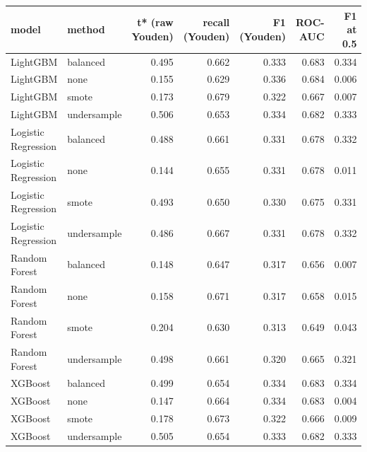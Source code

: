 \begin{tabular}{llrrrrr}
\toprule
model & method & t* (raw Youden) & recall (Youden) & F1 (Youden) & ROC-AUC & F1 at 0.5 \\
\midrule
LightGBM & balanced & 0.495 & 0.662 & 0.333 & 0.683 & 0.334 \\
LightGBM & none & 0.155 & 0.629 & 0.336 & 0.684 & 0.006 \\
LightGBM & smote & 0.173 & 0.679 & 0.322 & 0.667 & 0.007 \\
LightGBM & undersample & 0.506 & 0.653 & 0.334 & 0.682 & 0.333 \\
Logistic Regression & balanced & 0.488 & 0.661 & 0.331 & 0.678 & 0.332 \\
Logistic Regression & none & 0.144 & 0.655 & 0.331 & 0.678 & 0.011 \\
Logistic Regression & smote & 0.493 & 0.650 & 0.330 & 0.675 & 0.331 \\
Logistic Regression & undersample & 0.486 & 0.667 & 0.331 & 0.678 & 0.332 \\
Random Forest & balanced & 0.148 & 0.647 & 0.317 & 0.656 & 0.007 \\
Random Forest & none & 0.158 & 0.671 & 0.317 & 0.658 & 0.015 \\
Random Forest & smote & 0.204 & 0.630 & 0.313 & 0.649 & 0.043 \\
Random Forest & undersample & 0.498 & 0.661 & 0.320 & 0.665 & 0.321 \\
XGBoost & balanced & 0.499 & 0.654 & 0.334 & 0.683 & 0.334 \\
XGBoost & none & 0.147 & 0.664 & 0.334 & 0.683 & 0.004 \\
XGBoost & smote & 0.178 & 0.673 & 0.322 & 0.666 & 0.009 \\
XGBoost & undersample & 0.505 & 0.654 & 0.333 & 0.682 & 0.333 \\
\bottomrule
\end{tabular}
